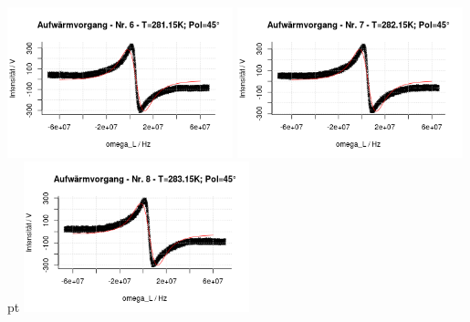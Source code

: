 \documentclass[12pt]{article}
\begin{document}
\begin{minipage}[h!]{\textwidth}
	\includegraphics[width=0.49\textwidth]{figures/warm45-6.png}\vskip -10pt
	\includegraphics[width=0.49\textwidth]{figures/warm45-7.png} pt
	\includegraphics[width=0.49\textwidth]{figures/warm45-8.png}\vskip -10pt
\end{minipage}
\end{document}
